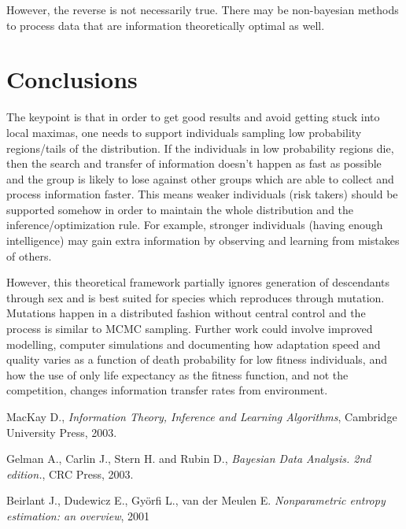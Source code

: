 \documentclass{article}
\begin{document}
However, the reverse is not necessarily true.  There may be non-bayesian methods to process data that are information theoretically optimal as well.


\section{Conclusions} \label{conclusions}

The keypoint is that in order to get good results and avoid getting stuck into local maximas, one needs to support individuals sampling low probability regions/tails of the distribution. If the individuals in low probability regions die, then the search and transfer of information doesn't happen as fast as possible and the group is likely to lose against other groups which are able to collect and process information faster. This means weaker individuals (risk takers) should be supported somehow in order to maintain the whole distribution and the inference/optimization rule. For example, stronger individuals (having enough intelligence) may gain extra information by observing and learning from mistakes of others. 

However, this theoretical framework partially ignores generation of descendants through sex and is best suited for species which reproduces through mutation. Mutations  happen in a distributed fashion without central control and the process is similar to MCMC sampling. Further work could involve improved modelling, computer simulations and documenting how adaptation speed and quality varies as a function of death probability for low fitness individuals, and how the use of only life expectancy as the fitness function, and not the competition, changes information transfer rates from environment.

\begin{thebibliography}{9}

  MacKay D.,
  \emph{Information Theory, Inference and Learning Algorithms},
  Cambridge University Press,
  2003.

  Gelman A., Carlin J., Stern H. and Rubin D.,
  \emph{Bayesian Data Analysis. 2nd edition.},
  CRC Press, 
  2003.

  Beirlant J., Dudewicz E., Györfi L., van der Meulen E.
  \emph{Nonparametric entropy estimation: an overview},
  2001

\end{thebibliography}
\end{document}
